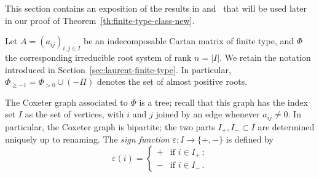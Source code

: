 \documentclass[letterpaper]{amsart}
\numberwithin{equation}{section}
\theoremstyle{definition}
\def\RR{\mathbb{R}}
\begin{document}
This section contains an exposition of the results in \cite{yga} 
and~\cite{cfz} that will be used later in our proof of 
Theorem~\ref{th:finite-type-class-new}. 
 
 
Let $A = (a_{ij})_{i,j \in I}$ be an indecomposable Cartan matrix 
of finite type, and $\Phi$ the corresponding irreducible root system 
of rank $n = |I|$. 
We retain the notation introduced in Section~\ref{sec:laurent-finite-type}. 
In particular, $\Phi_{\geq -1}=\Phi_{>0}\cup(-\Pi)$ denotes the set of almost positive 
roots. 
 
 
The Coxeter graph associated to $\Phi$ is a tree; 
recall that this graph has the index set $I$ as the set of vertices, with $i$ 
and $j$ joined by an edge whenever $a_{ij} \neq 0$. 
In particular, the Coxeter graph is bipartite; the two parts 
$I_+,I_-\subset I$ are determined uniquely up to renaming. 
The \emph{sign function} $\varepsilon:I\to\{+,-\}$ is defined by 
\begin{equation} 
\label{eq:sign-function} 
\varepsilon(i)=\begin{cases} 
+ & \text{if $i\in I_+\,$;}\\ 
- & \text{if $i\in I_-\,$.} 
\end{cases} 
\end{equation} 
 
\end{document}
